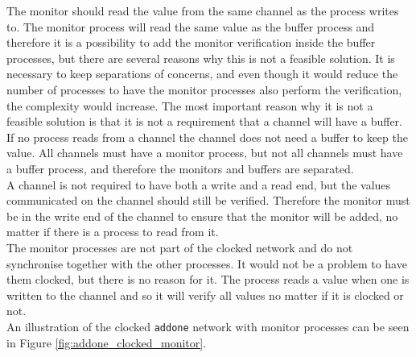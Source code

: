The monitor should read the value from the same channel as the process writes to. The monitor process will read the same value as the buffer process and therefore it is a possibility to add the monitor verification inside the buffer processes, but there are several reasons why this is not a feasible solution. It is necessary to keep separations of concerns, and even though it would reduce the number of processes to have the monitor processes also perform the verification, the complexity would increase. The most important reason why it is not a feasible solution is that it is not a requirement that a channel will have a buffer. If no process reads from a channel the channel does not need a buffer to keep the value. All channels must have a monitor process, but not all channels must have a buffer process, and therefore the monitors and buffers are separated.\\

A channel is not required to have both a write and a read end, but the values communicated on the channel should still be verified. Therefore the monitor must be in the write end of the channel to ensure that the monitor will be added, no matter if there is a process to read from it. \\

The monitor processes are not part of the clocked network and do not synchronise together with the other processes. It would not be a problem to have them clocked, but there is no reason for it. The process reads a value when one is written to the channel and so it will verify all values no matter if it is clocked or not.\\

An illustration of the clocked \texttt{addone} network with monitor processes can be seen in Figure \ref{fig:addone_clocked_monitor}.

